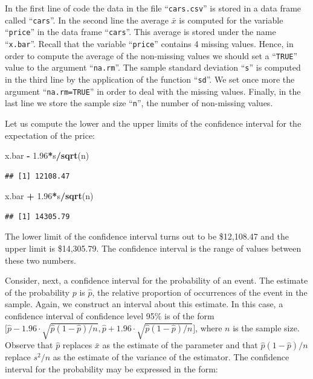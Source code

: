 \documentclass[
]{krantz}
\makeatletter
\newenvironment{Shaded}{\begin{snugshade}}{\end{snugshade}}
\newcommand{\FloatTok}[1]{\textcolor[rgb]{0.00,0.00,0.81}{#1}}
\newcommand{\KeywordTok}[1]{\textcolor[rgb]{0.13,0.29,0.53}{\textbf{#1}}}
\newcommand{\NormalTok}[1]{#1}
\newcommand{\OperatorTok}[1]{\textcolor[rgb]{0.81,0.36,0.00}{\textbf{#1}}}
\newcommand{\StringTok}[1]{\textcolor[rgb]{0.31,0.60,0.02}{#1}}
\newenvironment{kframe}{%
\medskip{}
\setlength{\fboxsep}{.8em}
 \def\at@end@of@kframe{}%
 \ifinner\ifhmode%
  \def\at@end@of@kframe{\end{minipage}}%
  \begin{minipage}{\columnwidth}%
 \fi\fi%
 \def\FrameCommand##1{\hskip\@totalleftmargin \hskip-\fboxsep
 \colorbox{shadecolor}{##1}\hskip-\fboxsep
     \hskip-\linewidth \hskip-\@totalleftmargin \hskip\columnwidth}%
 \MakeFramed {\advance\hsize-\width
   \@totalleftmargin\z@ \linewidth\hsize
   \@setminipage}}%
 {\par\unskip\endMakeFramed%
 \at@end@of@kframe}
\renewenvironment{Shaded}{\begin{kframe}}{\end{kframe}}
\theoremstyle{definition}
\theoremstyle{definition}
\theoremstyle{definition}
\theoremstyle{remark}
\makeatother
\begin{document}
In the first line of code the data in the file ``\texttt{cars.csv}'' is stored in
a data frame called ``\texttt{cars}''. In the second line the average \(\bar x\) is
computed for the variable ``\texttt{price}'' in the data frame ``\texttt{cars}''. This
average is stored under the name ``\texttt{x.bar}''. Recall that the variable
``\texttt{price}'' contains 4 missing values. Hence, in order to compute the
average of the non-missing values we should set a ``\texttt{TRUE}'' value to the
argument ``\texttt{na.rm}''. The sample standard deviation ``\texttt{s}'' is computed in
the third line by the application of the function ``\texttt{sd}''. We set once
more the argument ``\texttt{na.rm=TRUE}'' in order to deal with the missing
values. Finally, in the last line we store the sample size ``\texttt{n}'', the
number of non-missing values.

Let us compute the lower and the upper limits of the confidence interval
for the expectation of the price:

\begin{Shaded}
\begin{Highlighting}[]
\NormalTok{x.bar }\OperatorTok{-}\StringTok{ }\FloatTok{1.96}\OperatorTok{*}\NormalTok{s}\OperatorTok{/}\KeywordTok{sqrt}\NormalTok{(n)}
\end{Highlighting}
\end{Shaded}

\begin{verbatim}
## [1] 12108.47
\end{verbatim}

\begin{Shaded}
\begin{Highlighting}[]
\NormalTok{x.bar }\OperatorTok{+}\StringTok{ }\FloatTok{1.96}\OperatorTok{*}\NormalTok{s}\OperatorTok{/}\KeywordTok{sqrt}\NormalTok{(n)}
\end{Highlighting}
\end{Shaded}

\begin{verbatim}
## [1] 14305.79
\end{verbatim}

The lower limit of the confidence interval turns out to be \$12,108.47
and the upper limit is \$14,305.79. The confidence interval is the range
of values between these two numbers.

Consider, next, a confidence interval for the probability of an event.
The estimate of the probability \(p\) is \(\hat p\), the relative proportion
of occurrences of the event in the sample. Again, we construct an
interval about this estimate. In this case, a confidence interval of
confidence level 95\% is of the form
\(\big[\hat p - 1.96 \cdot \sqrt{\hat p(1-\hat p)/n}, \hat p + 1.96 \cdot \sqrt{\hat p(1-\hat p)/n}\big]\),
where \(n\) is the sample size. Observe that \(\hat p\) replaces \(\bar x\) as
the estimate of the parameter and that \(\hat p(1-\hat p)/n\) replace
\(s^2/n\) as the estimate of the variance of the estimator. The confidence
interval for the probability may be expressed in the form:
\end{document}

